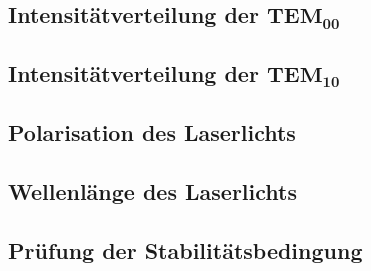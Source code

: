\subsection{Intensitätverteilung der $\mathbf{TEM_{00}}$\\}
	
	
	
\subsection{Intensitätverteilung der $\mathbf{TEM_{10}}$\\}
	
	

\subsection{Polarisation des Laserlichts}
	
	
\subsection{Wellenlänge des Laserlichts}
	
\subsection{Prüfung der Stabilitätsbedingung}
	
	